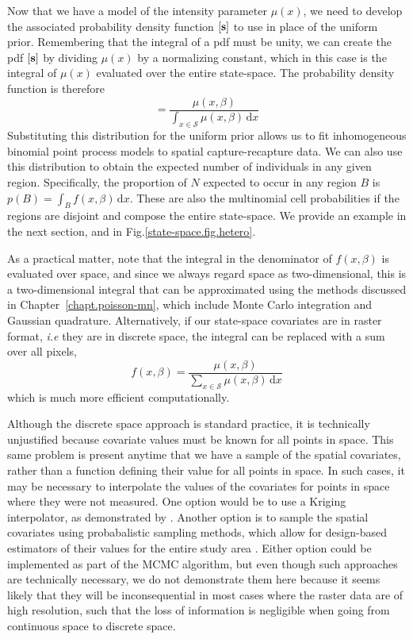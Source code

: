 Now that we have a model of the intensity parameter $\mu(x)$,
we need to develop the associated probability density function
$[\bf s]$ to use
in place of the uniform prior. Remembering that
the integral of a pdf must be unity, we can create the pdf
$[\bf s]$ by dividing
$\mu(x)$ by a normalizing constant, which in this case is the integral
of $\mu(x)$ evaluated over the entire state-space.
The probability density function is therefore
\begin{equation}
[\mathbf{s}] = \frac{\mu(x, \beta)}{\int_{x \in \mathcal{S}} \mu(x, \beta)\, \mathrm{d}x}
\label{eq.pdf.ipp}
\end{equation}
Substituting this distribution for the
uniform prior allows us to fit inhomogeneous binomial point process
models to spatial capture-recapture data. We can also use this
distribution to obtain the expected number of individuals in any given
region. Specifically, the proportion of $N$ expected to occur in any
region $B$ %
is $p(B) = \int_B
f(x, \beta)\, \mathrm{d}x$. These are
also the multinomial cell probabilities if the regions are
disjoint and compose the entire state-space. We provide an example in
the next section, and in Fig.\ref{state-space.fig.hetero}.

As a practical matter, note that the integral in the
denominator of $f(x, \beta)$ is evaluated over space, and since we always regard
space as two-dimensional, this is a two-dimensional integral that can
be approximated using the methods discussed in
Chapter~\ref{chapt.poisson-mn}, which include
Monte Carlo integration and Gaussian quadrature. Alternatively, if
our state-space covariates are in raster format, \emph{i.e} they are
in discrete space, the integral can be replaced with a sum over
all pixels,
\begin{equation}
f(x, \beta) = \frac{\mu(x, \beta)}{\sum_{x \in \mathcal{S}} \mu(x, \beta)\, \mathrm{d}x}
\label{eq.pdf.dipp.d}
\end{equation}
which is much more efficient computationally.

Although the discrete space approach is standard practice, it is
technically unjustified because covariate values must be known for all
points in space. This same problem is present anytime that we have a
sample of the spatial covariates, rather than a function defining
their value for all points in space. In such cases, it may be necessary to
interpolate the values of the covariates for points in space where
they were not measured. One option would be to use a Kriging
interpolator, as demonstrated by \citet{rathbun:1996}. Another option
is to sample the spatial covariates using probabalistic sampling
methods, which allow for design-based estimators of their values for
the entire study area \citep{rathbun_etal:2007}. Either option could
be implemented as part of the MCMC algorithm, but even though such
approaches are technically necessary, we do not demonstrate them here
because it seems likely that they will be inconsequential in most
cases where the raster data are of high resolution, such that the loss
of information is negligible when going from continuous space to
discrete space.


